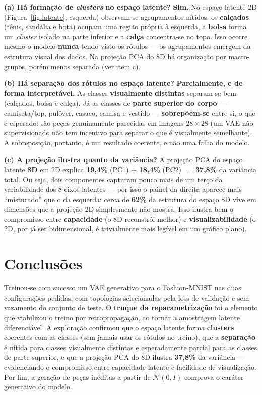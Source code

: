 \documentclass[11pt,a4paper]{article}
\begin{document}
\textbf{(a) Há formação de \textit{clusters} no espaço latente?}
\textbf{Sim.} No espaço latente 2D (Figura~\ref{fig:latente}, esquerda) observam-se agrupamentos nítidos: os \textbf{calçados} (tênis, sandália e bota) ocupam uma região própria à esquerda, a \textbf{bolsa} forma um \textit{cluster} isolado na parte inferior e a \textbf{calça} concentra-se no topo. Isso ocorre mesmo o modelo \textbf{nunca} tendo visto os rótulos --- os agrupamentos emergem da estrutura visual dos dados. Na projeção PCA do 8D há organização por macro-grupos, porém menos separada (ver item c).

\textbf{(b) Há separação dos rótulos no espaço latente?}
\textbf{Parcialmente, e de forma interpretável.} As classes \textbf{visualmente distintas} separam-se bem (calçados, bolsa e calça). Já as classes de \textbf{parte superior do corpo} --- camiseta/top, pulôver, casaco, camisa e vestido --- \textbf{sobrepõem-se} entre si, o que é esperado: são peças genuinamente parecidas em imagens $28\times28$ (um VAE não supervisionado não tem incentivo para separar o que é visualmente semelhante). A sobreposição, portanto, é um resultado coerente, e não uma falha do modelo.

\textbf{(c) A projeção ilustra quanto da variância?}
A projeção PCA do espaço latente \textbf{8D} em 2D explica \textbf{19{,}4\%} (PC1) $+$ \textbf{18{,}4\%} (PC2) $=$ \textbf{37{,}8\%} da variância total. Ou seja, dois componentes capturam pouco mais de um terço da variabilidade dos 8 eixos latentes --- por isso o painel da direita aparece mais ``misturado'' que o da esquerda: cerca de \textbf{62\%} da estrutura do espaço 8D vive em dimensões que a projeção 2D simplesmente não mostra. Isso ilustra bem o compromisso entre \textbf{capacidade} (o 8D reconstrói melhor) e \textbf{visualizabilidade} (o 2D, por já ser bidimensional, é trivialmente mais legível em um gráfico plano).

\section{Conclusões}

Treinou-se com sucesso um VAE generativo para o Fashion-MNIST nas duas configurações pedidas, com topologias selecionadas pela loss de validação e sem vazamento do conjunto de teste. O \textbf{truque da reparametrização} foi o elemento que viabilizou o treino por retropropagação, ao tornar a amostragem latente diferenciável. A exploração confirmou que o espaço latente forma \textbf{clusters} coerentes com as classes (sem jamais usar os rótulos no treino), que a \textbf{separação} é nítida para classes visualmente distintas e esperadamente parcial para as classes de parte superior, e que a projeção PCA do 8D ilustra \textbf{37{,}8\%} da variância --- evidenciando o compromisso entre capacidade latente e facilidade de visualização. Por fim, a geração de peças inéditas a partir de $\mathcal{N}(0, I)$ comprova o caráter generativo do modelo.
\end{document}
